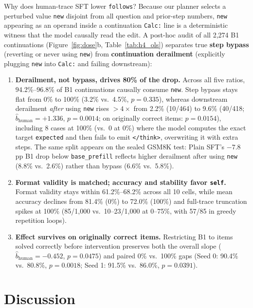 \documentclass[11pt]{article}
\begin{document}
Why does human-trace SFT lower \texttt{follows}?
Because our planner selects a perturbed value \texttt{new} disjoint from all question and prior-step numbers, \texttt{new} appearing as an operand inside a continuation \texttt{Calc:} line is a deterministic witness that the model causally read the edit.
A post-hoc audit of all 2,274 B1 continuations (Figure~\ref{fig:dose}b, Table~\ref{tab:h4_ols}) separates true \textbf{step bypass} (reverting or never using \texttt{new}) from \textbf{continuation derailment} (explicitly plugging \texttt{new} into \texttt{Calc:} and failing downstream):
\begin{enumerate}
    \setlength{\itemsep}{1.5pt}
    \item \textbf{Derailment, not bypass, drives 80\% of the drop.} Across all five ratios, 94.2\%--96.8\% of B1 continuations causally consume \texttt{new}. Step bypass stays flat from 0\% to 100\% (3.2\% vs.\ 4.5\%, $p=0.335$), whereas downstream derailment \emph{after} using \texttt{new} rises $>4\times$ from 2.2\% (10/464) to 9.6\% (40/418; $\hat b_{\text{human}} = +1.336$, $p=0.0014$; on originally correct items: $p=0.0154$), including 8 cases at 100\% (vs.\ 0 at 0\%) where the model computes the exact target \texttt{expected} and then fails to emit \texttt{</think>}, overwriting it with extra steps. The same split appears on the sealed GSM8K test: Plain SFT's $-7.8$ pp B1 drop below \texttt{base\_prefill} reflects higher derailment after using \texttt{new} (8.8\% vs.\ 2.6\%) rather than bypass (6.6\% vs.\ 5.8\%).
    \item \textbf{Format validity is matched; accuracy and stability favor \texttt{self}.} Format validity stays within 61.2\%--68.2\% across all 10 cells, while mean accuracy declines from 81.4\% (0\%) to 72.0\% (100\%) and full-trace truncation spikes at 100\% (85/1,000 vs.\ 10--23/1,000 at 0--75\%, with 57/85 in greedy repetition loops).
    \item \textbf{Effect survives on originally correct items.} Restricting B1 to items solved correctly before intervention preserves both the overall slope ($\hat b_{\text{human}} = -0.452$, $p=0.0475$) and paired 0\% vs.\ 100\% gaps (Seed 0: 90.4\% vs.\ 80.8\%, $p=0.0018$; Seed 1: 91.5\% vs.\ 86.0\%, $p=0.0391$).
\end{enumerate}

\section{Discussion}
\label{sec:discussion}
\end{document}

